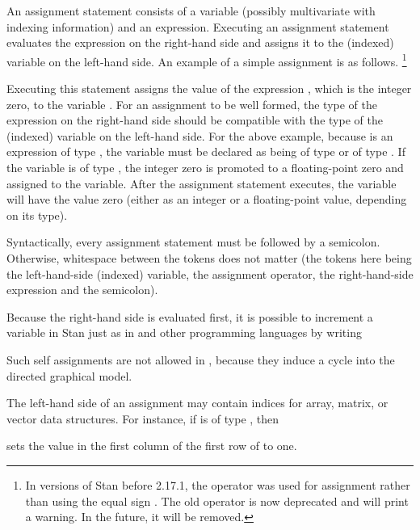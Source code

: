 An assignment statement consists of a variable (possibly multivariate
with indexing information) and an expression.  Executing an
assignment statement evaluates the expression on the right-hand side
and assigns it to the (indexed) variable on the left-hand side.  An
example of a simple assignment is as follows.%
%
\footnote{In versions of Stan before 2.17.1, the operator \code{<-} was
  used for assignment rather than using the equal sign \code{=}.  The
  old operator \code{<-} is now deprecated and will print a warning.
  In the future, it will be removed.}
%
\begin{quote}
\end{quote}
%
Executing this statement assigns the value of the expression ,
which is the integer zero, to the variable .  For an assignment
to be well formed, the type of the expression on the right-hand side
should be compatible with the type of the (indexed) variable on the
left-hand side.  For the above example, because  is an
expression of type , the variable  must be declared
as being of type  or of type .  If the variable
is of type , the integer zero is promoted to a
floating-point zero and assigned to the variable.  After the
assignment statement executes, the variable  will have the
value zero (either as an integer or a floating-point value, depending on
its type).

Syntactically, every assignment statement must be followed by a
semicolon.  Otherwise, whitespace between the tokens does not matter
(the tokens here being the left-hand-side (indexed) variable, the
assignment operator, the right-hand-side expression and the
semicolon).

Because the right-hand side is evaluated first, it is possible to
increment a variable in Stan just as in \Cpp and other programming
languages by writing
%
\begin{quote}
\end{quote}
%
Such self assignments are not allowed in \BUGS, because they induce a
cycle into the directed graphical model.

The left-hand side of an assignment may contain indices for array,
matrix, or vector data structures.  For instance, if  is
of type , then
%
\begin{quote}
\end{quote}
%
sets the value in the first column of the first row of  to one.

